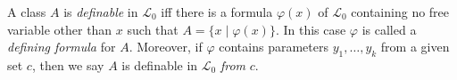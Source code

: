 A class $A$ is \textit{definable} in $\mathcal{L}_0$ iff there is a formula $\varphi(x)$ of $\mathcal{L}_0$ containing no free variable other than $x$ such that $A = \{x \mid \varphi(x)\}$. In this case $\varphi$ is called a \textit{defining formula} for $A$. Moreover, if $\varphi$ contains parameters $y_1, \ldots, y_k$ from a given set $c$, then we say $A$ is definable in $\mathcal{L}_0$ \textit{from} $c$.
